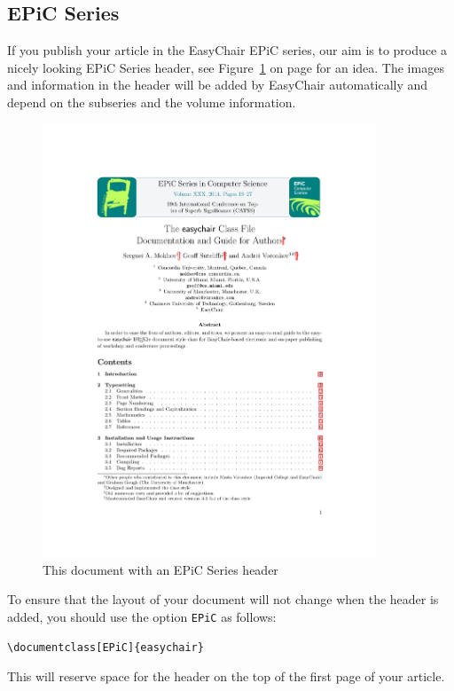 \documentclass{easychair}
\begin{document}
\subsection{EPiC Series}
\label{subsec:EPiC}

If you publish your article in the EasyChair EPiC series, our aim is to produce
a nicely looking EPiC Series header, see Figure~\ref{fig:epicheader} on page
\pageref{fig:epicheader} for an idea. The images and information in the header
will be added by EasyChair automatically and depend on the subseries and the
volume information.

\begin{figure}
  \begin{centering}
    \includegraphics[width=0.89\textwidth]{epic.pdf}
    \caption{This document with an EPiC Series header} 
    \label{fig:epicheader}
  \end{centering}
\end{figure}

To ensure that the layout of your document will not change when the header is
added, you should use the option \texttt{EPiC} as follows:

\small
\begin{verbatim}
\documentclass[EPiC]{easychair}
\end{verbatim}
\normalsize
This will reserve space for the header on the top of the first page of your
article. 
\end{document}
